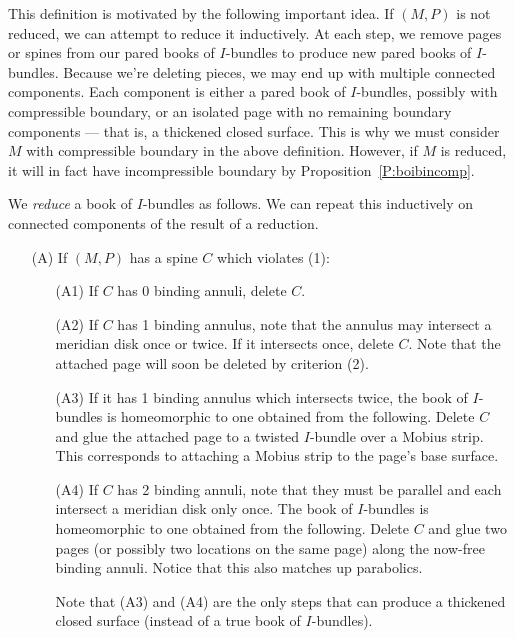 This definition is motivated by the following important idea. If $(M,P)$ is not
reduced, we can attempt to reduce it inductively. At each step, we remove pages
or spines from our pared books of $I$-bundles to produce new pared books of
$I$-bundles.  Because we're deleting pieces, we may end up with multiple
connected components. Each component is either a pared book of $I$-bundles,
possibly with compressible boundary, or an isolated page with no remaining
boundary components --- that is, a thickened closed surface. This is why we
must consider $M$ with compressible boundary in the above definition. However,
if $M$ is reduced, it will in fact have incompressible boundary by
Proposition~\ref{P:boibincomp}.

\begin{defn}

We \emph{reduce} a book of $I$-bundles as follows. We can repeat this
inductively on connected components of the result of a reduction.

\begin{enumerate}

\item[(A)] If $(M,P)$ has a spine $C$ which violates (1):

\begin{enumerate}

\item[(A1)] If $C$ has 0 binding annuli, delete $C$.

\item[(A2)] If $C$ has 1 binding annulus, note that the annulus may intersect
a meridian disk once or twice. If it intersects once, delete $C$. Note that the
attached page will soon be deleted by criterion (2).

\item[(A3)] If it has 1 binding annulus which intersects twice, the book of
$I$-bundles is homeomorphic to one obtained from the following.  Delete $C$ and
glue the attached page to a twisted $I$-bundle over a Mobius strip. This
corresponds to attaching a Mobius strip to the page's base surface.

\item[(A4)] If $C$ has 2 binding annuli, note that they must be parallel and
each intersect a meridian disk only once. The book of $I$-bundles is
homeomorphic to one obtained from the following. Delete $C$ and glue two pages
(or possibly two locations on the same page) along the now-free binding annuli.
Notice that this also matches up parabolics.

Note that (A3) and (A4) are the only steps that can produce a thickened closed
surface (instead of a true book of $I$-bundles).


\end{enumerate}
\end{enumerate}
\end{defn}
